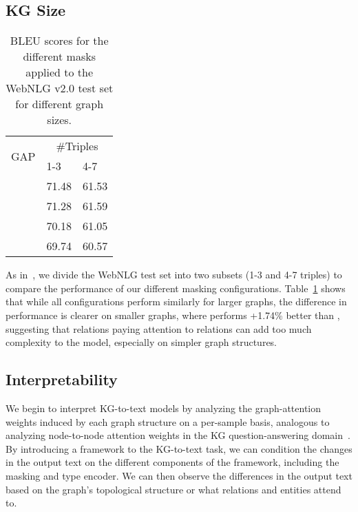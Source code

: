 \documentclass[11pt]{article}
\begin{document}
\subsection{KG Size}
\begin{table}[]
\centering
\begin{tabular}{lll}
\hline
\multicolumn{1}{c}{\multirow{2}{*}{GAP}} & \multicolumn{2}{c}{\#Triples} \\ \cline{2-3} 
\multicolumn{1}{c}{}                        & 1-3           & 4-7           \\ \hline
                                           & 71.48         & 61.53         \\ \hline
                                          & 71.28         & 61.59         \\ \hline
                                          & 70.18         & 61.05         \\ \hline
                                         & 69.74         & 60.57         \\ \hline
\end{tabular}
\caption{\label{tab:sizewebnlg} BLEU scores for the different masks applied to the WebNLG v2.0 test set for different graph sizes.}
\end{table}
As in~\citet{ke-etal-2021-jointgt}, we divide the WebNLG test set into two subsets (1-3 and 4-7 triples) to compare the performance of our different masking configurations. Table~\ref{tab:sizewebnlg} shows that while all configurations perform similarly for larger graphs, the difference in performance is clearer on smaller graphs, where  performs +1.74\% better than , suggesting that relations paying attention to relations can add too much complexity to the model, especially on simpler graph structures.

\subsection{Interpretability}
We begin to interpret KG-to-text models by analyzing the graph-attention weights induced by each graph structure on a per-sample basis, analogous to analyzing node-to-node attention weights in the KG question-answering domain~\cite{yasunaga2021qa}. By introducing a framework to the KG-to-text task, we can condition the changes in the output text on the different components of the framework, including the masking and type encoder. We can then observe the differences in the output text based on the graph's topological structure or what relations and entities attend to.
\end{document}
